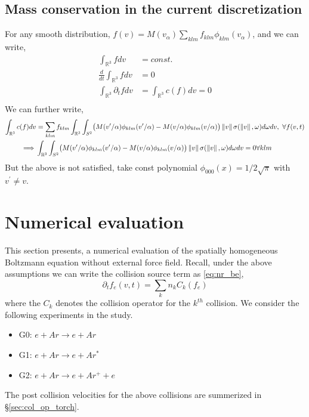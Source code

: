 \documentclass{article}
\newcommand{\RR}{\mathbb{R}}
\begin{document}
\subsection{Mass conservation in the current discretization}
For any smooth distribution, $f(v) = M(v_\alpha) \sum_{klm} f_{klm} \phi_{klm}(v_\alpha)$, and we can write, 
\begin{align}
    \int_{\RR^3} f dv &= const.  \\
    \frac{d}{dt} \int_{\RR^3} f dv &= 0  \\
    \int_{\RR^3} \partial_t f  dv &= \int_{\RR^3} c(f) dv =0 \\
\end{align}
We can further write, 
\begin{align}
    \int_{\RR^3} c(f) dv  &= \sum_{klm} f_{klm} \int_{\RR^3}\int_{S^2} \bigl( M(v^\prime/\alpha) \phi_{klm}(v^\prime/\alpha) -   M(v/\alpha) \phi_{klm}(v/\alpha) \bigr) \norm{v} \sigma(\norm{v},\omega) d\omega dv, \  \forall f(v,t) \\
    \implies & \int_{\RR^3}\int_{S^2} \bigl( M(v^\prime/\alpha) \phi_{klm}(v^\prime/\alpha) -   M(v/\alpha) \phi_{klm}(v/\alpha) \bigr) \norm{v} \sigma(\norm{v},\omega) d\omega dv =0  \forall klm
\end{align}
But the above is not satisfied, take const polynomial $\phi_{000}(x)=1/2\sqrt{\pi}$ with $v^\prime \neq v$.  

\newpage
\section{Numerical evaluation}
This section presents, a numerical evaluation of the spatially homogeneous Boltzmann equation without external force field. Recall, under the above assumptions we can write the collision source term as \eqref{eq:nr_be}, 
\begin{equation}
	\partial_t f_e(v,t) = \sum_{k} n_k C_k(f_e) \label{eq:nr_be}
\end{equation} where the $C_k$ denotes the collision operator for the $k^{th}$ collision. We consider the following experiments in the study. 
\begin{itemize}
\item G0: $e + Ar \rightarrow e + Ar $ 
\item G1: $e + Ar \rightarrow e + Ar^*$
\item G2: $e + Ar \rightarrow e + Ar^+ + e$ 
\end{itemize} The post collision velocities for the above collisions are summerized in \S\ref{sec:col_op_torch}.
\end{document}

